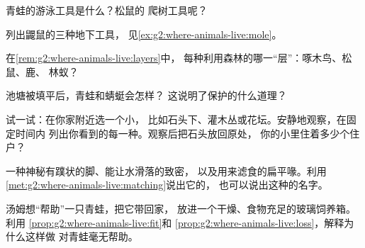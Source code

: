 \begin{exercise}[$\star$]\label{exo:g2:where-animals-live:4}
青蛙的游泳工具是什么？松鼠的
爬树工具呢？
\end{exercise}

\begin{exercise}[$\star$]\label{exo:g2:where-animals-live:5}
列出鼹鼠的三种地下工具，
见\cref{ex:g2:where-animals-live:mole}。
\end{exercise}

\begin{exercise}[$\star$]\label{exo:g2:where-animals-live:6}
在\cref{rem:g2:where-animals-live:layers}中，
每种利用森林的哪一“层”：啄木鸟、松鼠、鹿、
林蚁？
\end{exercise}

\begin{exercise}[$\star$]\label{exo:g2:where-animals-live:7}
池塘被填平后，青蛙和蜻蜓会怎样？
这说明了保护的什么道理？
\end{exercise}

\begin{exercise}[$\star$]\label{exo:g2:where-animals-live:8}
试一试：在你家附近选一个小，
比如石头下、灌木丛或花坛。安静地观察，在固定时间内
列出你看到的每一种。观察后把石头放回原处，
你的小里住着多少个住户？
\end{exercise}

\begin{exercise}[$\star\star$]\label{exo:g2:where-animals-live:9}
一种神秘有蹼状的脚、能让水滑落的致密，
以及用来滤食的扁平喙。利用
\cref{met:g2:where-animals-live:matching}说出它的，
也可以说出这种的名字。
\end{exercise}

\begin{exercise}[$\star\star$]\label{exo:g2:where-animals-live:10}
汤姆想“帮助”一只青蛙，把它带回家，
放进一个干燥、食物充足的玻璃饲养箱。利用
\cref{prop:g2:where-animals-live:fit}和
\cref{prop:g2:where-animals-live:loss}，解释为什么这样做
对青蛙毫无帮助。
\end{exercise}
